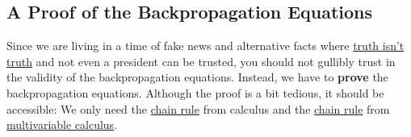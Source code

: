 \subsection{A Proof of the Backpropagation Equations}
Since we are living in a time of fake news and alternative facts where
\href{https://www.theguardian.com/us-news/2018/aug/19/truth-isnt-truth-rudy-giuliani-trump-alternative-facts-orwellian}{truth isn't truth} 
and not even a president can be trusted,  you should not gullibly trust in the validity of the backpropagation
equations.  Instead,  
we have to \textbf{prove} the backpropagation equations.  Although the proof is a bit tedious, it should be
accessible: We only need the \href{https://en.wikipedia.org/wiki/Chain_rule}{chain rule} from calculus and the 
\href{https://en.wikipedia.org/wiki/Chain_rule#Multivariable_case}{chain rule} from
\href{https://en.wikipedia.org/wiki/Multivariable_calculus}{multivariable calculus}. 

